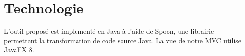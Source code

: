 \section{Technologie}

L'outil proposé est implementé en Java à l'aide de Spoon, une librairie permettant la transformation de code source Java. La vue de notre MVC utilise JavaFX 8.